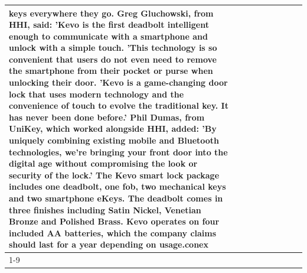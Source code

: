 \begin{table}[H]
\begin{tabular}{lllrlllll}
keys everywhere they go. Greg Gluchowski, from HHI, said: 'Kevo is the first deadbolt intelligent enough to communicate with a smartphone and unlock with a simple touch. 'This technology is so convenient that users do not even need to remove the smartphone from their pocket or purse when unlocking their door. 'Kevo is a game-changing door lock that uses modern technology and the convenience of touch to evolve the traditional key. It has never been done before.' Phil Dumas, from UniKey, which worked alongside HHI, added: 'By uniquely combining existing mobile and Bluetooth technologies, we’re bringing your front door into the digital age without compromising the look or security of the lock.' The Kevo smart lock package includes one deadbolt, one fob, two mechanical keys and two smartphone eKeys. The deadbolt comes in three finishes including Satin Nickel, Venetian Bronze and Polished Brass. Kevo operates on four included AA batteries, which the company claims should last for a year depending on usage.conex \\
\cline{1-9}

\end{tabular}
\end{table}
